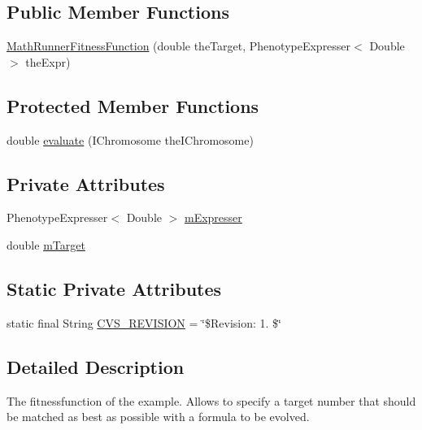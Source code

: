 \subsection*{Public Member Functions}
\begin{DoxyCompactItemize}
\item 
\hyperlink{classexamples_1_1math_1_1ga_1_1_math_runner_fitness_function_af993e2b5fc322260bda8c63996a59d97}{Math\-Runner\-Fitness\-Function} (double the\-Target, Phenotype\-Expresser$<$ Double $>$ the\-Expr)
\end{DoxyCompactItemize}
\subsection*{Protected Member Functions}
\begin{DoxyCompactItemize}
\item 
double \hyperlink{classexamples_1_1math_1_1ga_1_1_math_runner_fitness_function_a62394051f14179e40e8f0ec24b571462}{evaluate} (I\-Chromosome the\-I\-Chromosome)
\end{DoxyCompactItemize}
\subsection*{Private Attributes}
\begin{DoxyCompactItemize}
\item 
Phenotype\-Expresser$<$ Double $>$ \hyperlink{classexamples_1_1math_1_1ga_1_1_math_runner_fitness_function_a3864f7417ea5dff701175b207520432c}{m\-Expresser}
\item 
double \hyperlink{classexamples_1_1math_1_1ga_1_1_math_runner_fitness_function_a10d80f3ce2b42f38d9fc4101df62461e}{m\-Target}
\end{DoxyCompactItemize}
\subsection*{Static Private Attributes}
\begin{DoxyCompactItemize}
\item 
static final String \hyperlink{classexamples_1_1math_1_1ga_1_1_math_runner_fitness_function_a430cec0f5baf8d03025b7b0220b64210}{C\-V\-S\-\_\-\-R\-E\-V\-I\-S\-I\-O\-N} = \char`\"{}\$Revision\-: 1. \$\char`\"{}
\end{DoxyCompactItemize}


\subsection{Detailed Description}
The fitnessfunction of the example. Allows to specify a target number that should be matched as best as possible with a formula to be evolved.

